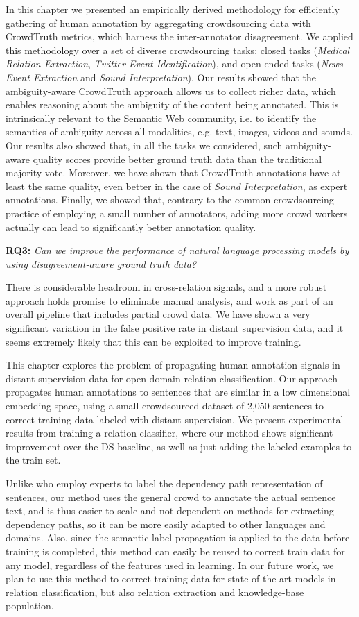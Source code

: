 In this chapter we presented an empirically derived methodology for efficiently gathering of human annotation by aggregating crowdsourcing data with CrowdTruth metrics, which harness the inter-annotator disagreement. We applied this methodology over a set of diverse crowdsourcing tasks: closed tasks (\textit{Medical Relation Extraction}, \textit{Twitter Event Identification}), and open-ended tasks (\textit{News Event Extraction} and \textit{Sound Interpretation}).  Our results showed that the ambiguity-aware CrowdTruth approach allows us to collect richer data, which enables reasoning about the ambiguity of the content being annotated. This is intrinsically relevant to the Semantic Web community, i.e. to identify the semantics of ambiguity across all modalities, e.g. text, images, videos and sounds. Our results also showed that, in all the tasks we considered, such ambiguity-aware quality scores provide better ground truth data than the traditional majority vote. Moreover, we have shown that CrowdTruth annotations have at least the same quality, even better in the case of \textit{Sound Interpretation}, as expert annotations.  Finally, we showed that, contrary to the common crowdsourcing practice of employing a small number of annotators, adding more crowd workers actually can lead to significantly better annotation quality.

\textbf{RQ3:} \textit{Can we improve the performance of natural language processing models by using disagreement-aware ground truth data?}

There is considerable headroom in cross-relation signals, and a more robust approach holds promise to eliminate manual analysis, and work as part of an overall pipeline that includes partial crowd data. We have shown a very significant variation in the false positive rate in distant supervision data, and it seems extremely likely that this can be exploited to improve training.

This chapter explores the problem of propagating human annotation signals in distant supervision data for open-domain relation classification.  Our approach propagates human annotations to sentences that are similar in a low dimensional embedding space, using a small crowdsourced dataset of 2,050 sentences to correct training data labeled with distant supervision.  We present experimental results from training a relation classifier, where our method shows significant improvement over the DS baseline, as well as just adding the labeled examples to the train set.

Unlike \citet{sterckx2016knowledge} who employ experts to label the dependency path representation of sentences, our method uses the general crowd to annotate the actual sentence text, and is thus easier to scale and not dependent on methods for extracting dependency paths, so it can be more easily adapted to other languages and domains.  Also, since the semantic label propagation is applied to the data before training is completed, this method can easily be reused to correct train data for any model, regardless of the features used in learning.  In our future work, we plan to use this method to correct training data for state-of-the-art models in relation classification, but also relation extraction and knowledge-base population.

